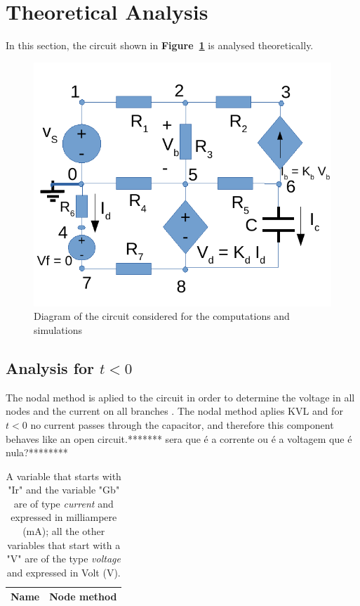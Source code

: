 \section{Theoretical Analysis}
\label{sec:analysis}

In this section, the circuit shown in \textbf{Figure~\ref{fig:diagram_t2}} is analysed
theoretically.\par

\begin{figure}[h] \centering
\includegraphics[width=0.6\linewidth]{diagram_t2.pdf}
\caption{Diagram of the circuit considered for the computations and simulations}
\label{fig:diagram_t2}
\end{figure}


\subsection{Analysis for $t<0$} 
The nodal method is aplied to the circuit in order to determine the voltage in all nodes and the current on all branches . The nodal method aplies KVL and for $t<0$ no current passes through the capacitor, and therefore this component behaves like an open circuit.******* sera que é a corrente ou é a voltagem que é nula?******** 
 \pagebreak 
\begin{table}[h]
  \centering
  \begin{tabular}{|l|r|}
    \hline    
    {\bf Name} & {\bf Node method}\\ \hline
    
  \end{tabular}
  \caption{A variable that starts with "Ir" and the variable "Gb" are of type {\em current}
    and expressed in milliampere (mA); all the other variables that start with a "V" are of the type {\it voltage} and expressed in
    Volt (V).}
  \label{tab:theoretical}
\end{table}



